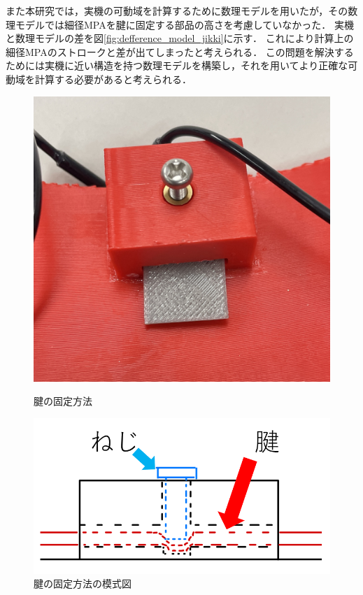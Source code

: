 また本研究では，実機の可動域を計算するために数理モデルを用いたが，その数理モデルでは細径MPAを腱に固定する部品の高さを考慮していなかった．
実機と数理モデルの差を図\ref{fig:defference_model_jikki}に示す．
これにより計算上の細径MPAのストロークと差が出てしまったと考えられる．
この問題を解決するためには実機に近い構造を持つ数理モデルを構築し，それを用いてより正確な可動域を計算する必要があると考えられる．
\begin{figure}[ht]
    \begin{minipage}{0.49\hsize}
      \centering
      \includegraphics[scale=0.2]{image/kenkotei.jpg}
      \caption{腱の固定方法}
      \label{fig:ken_kotei}
    \end{minipage}
    \begin{minipage}{0.49\hsize}
      \centering
      \includegraphics[scale=0.2]{image/moshiki_edited.png}
      \caption{腱の固定方法の模式図}
      \label{fig:ken_kotei_moshiki}
    \end{minipage}
\end{figure}
